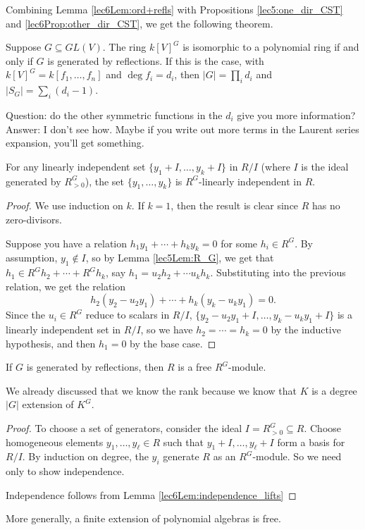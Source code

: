 Combining Lemma \ref{lec6Lem:ord+refls} with Propositions \ref{lec5:one_dir_CST} and \ref{lec6Prop:other_dir_CST}, we get the following theorem.
\begin{theorem}
 Suppose $G\subseteq GL(V)$. The ring $k[V]^G$ is isomorphic to a polynomial ring if and only if $G$ is generated by reflections. If this is the case, with $k[V]^G=k[f_1,\dots, f_n]$ and $\deg f_i=d_i$, then $|G|=\prod_i d_i$ and $|S_G|=\sum_i (d_i-1)$.
\end{theorem}
Question: do the other symmetric functions in the $d_i$ give you more information? Answer: I don't see how. Maybe if you write out more terms in the Laurent series expansion, you'll get something.

\begin{lemma}\label{lec6Lem:independence_lifts}
 For any linearly independent set $\{y_1+I,\dots, y_k+I\}$ in $R/I$ (where $I$ is the ideal generated by $R^G_{>0}$), the set $\{y_1,\dots, y_k\}$ is $R^G$-linearly independent in $R$.
\end{lemma}
\begin{proof}
 We use induction on $k$. If $k=1$, then the result is clear since $R$ has no zero-divisors.

 Suppose you have a relation $h_1y_1+\cdots+h_ky_k=0$ for some $h_i\in R^G$. By assumption, $y_1\not\in I$, so by Lemma \ref{lec5Lem:R_G}, we get that $h_1\in R^Gh_2+\cdots+R^G h_k$, say $h_1=u_2h_2+\cdots u_kh_k$. Substituting into the previous relation, we get the relation
 \[
  h_2(y_2-u_2y_1)+\cdots + h_k(y_k-u_ky_1)=0.
 \]
 Since the $u_i\in R^G$ reduce to scalars in $R/I$, $\{y_2-u_2y_1+I, \dots, y_k-u_ky_1+I\}$ is a linearly independent set in $R/I$, so we have $h_2=\cdots =h_k=0$ by the inductive hypothesis, and then $h_1=0$ by the base case.
\end{proof}

\begin{proposition}
 If $G$ is generated by reflections, then $R$ is a free $R^G$-module.
\end{proposition}
We already discussed that we know the rank because we know that $K$ is a degree $|G|$ extension of $K^G$.
\begin{proof}
 To choose a set of generators, consider the ideal $I=R^G_{>0}\subseteq R$. Choose homogeneous elements $y_1,\dots, y_\ell\in R$ such that $y_1+I,\dots, y_\ell+I$ form a basis for $R/I$. By induction on degree, the $y_i$ generate $R$ as an $R^G$-module. So we need only to show independence. 
 
 Independence follows from Lemma \ref{lec6Lem:independence_lifts}
\end{proof}
More generally, a finite extension of polynomial algebras is free. 

